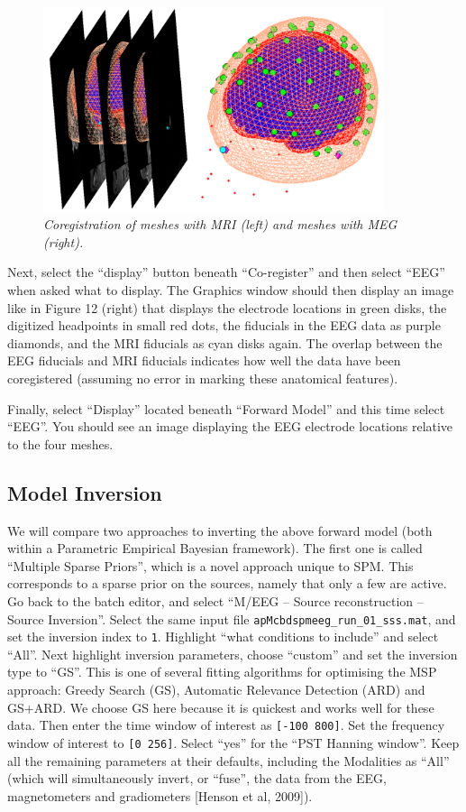 \begin{figure}
\begin{center}
\includegraphics[width=100mm]{multi/figures/figure12}
\caption{\em Coregistration of meshes with MRI (left) and meshes with MEG (right). \label{multi:fig:12}}
\end{center}
\end{figure}

Next, select the ``display'' button beneath ``Co-register'' and then select ``EEG'' when asked  what to display. The Graphics window should then display an image like in Figure 12 (right) that displays the electrode locations in green disks, the digitized headpoints in small red dots, the fiducials in the EEG data as purple diamonds, and the MRI fiducials as cyan disks again. The overlap between the EEG fiducials and MRI fiducials indicates how well the data have been coregistered (assuming no error in marking these anatomical features). 

Finally, select ``Display'' located beneath ``Forward Model'' and this time select ``EEG''. You should see an image displaying the EEG electrode locations relative to the four meshes. 

\subsection{Model Inversion}

We will compare two approaches to inverting the above forward model (both within a Parametric Empirical Bayesian framework). The first one is called ``Multiple Sparse Priors'', which is a novel approach unique to SPM. This corresponds to a sparse prior on the sources, namely that only a few are active. Go back to the batch editor, and select ``M/EEG -- Source reconstruction -- Source Inversion''. Select the same input file \texttt{apMcbdspmeeg\_run\_01\_sss.mat}, and set the inversion index to \texttt{1}. Highlight ``what conditions to include'' and select ``All''. Next highlight inversion parameters, choose ``custom'' and set the inversion type to ``GS''. This is one of several fitting algorithms for optimising the MSP approach: Greedy Search (GS), Automatic Relevance Detection (ARD) and GS+ARD. We choose GS here because it is quickest and works well for these data. Then enter the time window of interest as \texttt{[-100 800]}. Set the frequency window of interest to \texttt{[0 256]}. Select ``yes'' for the ``PST Hanning window''. Keep all the remaining parameters at their defaults, including the Modalities as ``All'' (which will simultaneously invert, or ``fuse'', the data from the EEG, magnetometers and gradiometers [Henson et al, 2009]).

